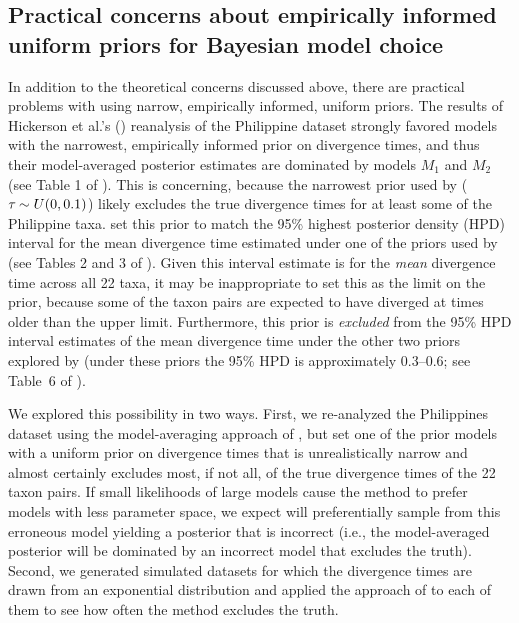 \subsection{Practical concerns about empirically informed uniform priors for
    Bayesian model choice}
In addition to the theoretical concerns discussed above, there are practical
problems with using narrow, empirically informed, uniform priors.
The results of Hickerson et al.'s (\citeyear{Hickerson2013}) reanalysis of the
Philippine dataset strongly favored models with the narrowest, empirically
informed prior on divergence times, and thus their model-averaged posterior
estimates are dominated by models $M_1$ and $M_2$ (see Table 1 of
\citet{Hickerson2013}).
This is concerning, because the narrowest \divt{} prior used by
\citet{Hickerson2013} ($\tau_{} \sim U(0,0.1)$) likely excludes the true
divergence times for at least some of the Philippine taxa.
\citet{Hickerson2013} set this prior to match the 95\% highest posterior
density (HPD) interval for the mean divergence time estimated under one of the
priors used by \citet{Oaks2012} (see Tables 2 and 3 of \citet{Oaks2012}).
Given this interval estimate is for the \emph{mean} divergence time across all
22 taxa, it may be inappropriate to set this as the limit on the prior, because
some of the taxon pairs are expected to have diverged at times older than the
upper limit.
Furthermore, this prior is \emph{excluded} from the 95\% HPD interval estimates
of the mean divergence time under the other two priors explored by
\citet{Oaks2012} (under these priors the 95\% HPD is approximately 0.3--0.6;
see Table~6 of \citet{Oaks2012}).

We explored this possibility in two ways.
First, we re-analyzed the Philippines dataset using the model-averaging
approach of \citet{Hickerson2013}, but set one of the prior models with a
uniform prior on divergence times that is unrealistically narrow and almost
certainly excludes most, if not all, of the true divergence times of the 22
taxon pairs.
If small likelihoods of large models cause the method to prefer models with
less parameter space, we expect \msb will preferentially sample from this
erroneous model yielding a posterior that is incorrect (i.e., the
model-averaged posterior will be dominated by an incorrect model that excludes
the truth).
Second, we generated simulated datasets for which the divergence times are
drawn from an exponential distribution and applied the approach of
\citet{Hickerson2013} to each of them to see how often the method excludes the
truth.

